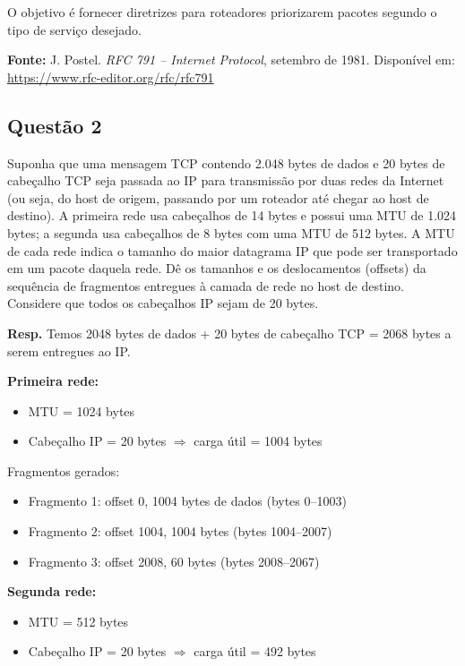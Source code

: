 O objetivo é fornecer diretrizes para roteadores priorizarem pacotes segundo o tipo de serviço desejado.

\textbf{Fonte:} J. Postel. \textit{RFC 791 – Internet Protocol}, setembro de 1981. Disponível em: \url{https://www.rfc-editor.org/rfc/rfc791}
\newline

\subsection{Questão 2}

Suponha que uma mensagem TCP contendo 2.048 bytes de dados e 20 bytes
de cabeçalho TCP seja passada ao IP para transmissão por duas redes da Internet
(ou seja, do host de origem, passando por um roteador até chegar ao host de
destino). A primeira rede usa cabeçalhos de 14 bytes e possui uma MTU de 1.024
bytes; a segunda usa cabeçalhos de 8 bytes com uma MTU de 512 bytes. A MTU de
cada rede indica o tamanho do maior datagrama IP que pode ser transportado em um
pacote daquela rede. Dê os tamanhos e os deslocamentos (offsets) da sequência de
fragmentos entregues à camada de rede no host de destino. Considere que todos os
cabeçalhos IP sejam de 20 bytes.
\newline

\textbf{Resp.} 
Temos 2048 bytes de dados + 20 bytes de cabeçalho TCP = 2068 bytes a serem entregues ao IP.
\newline

\textbf{Primeira rede:}
\begin{itemize}
    \item MTU = 1024 bytes
    \item Cabeçalho IP = 20 bytes $\Rightarrow$ carga útil = 1004 bytes
\end{itemize}


Fragmentos gerados:
\begin{itemize}
    \item Fragmento 1: offset 0, 1004 bytes de dados (bytes 0–1003)
    \item Fragmento 2: offset 1004, 1004 bytes (bytes 1004–2007)
    \item Fragmento 3: offset 2008, 60 bytes (bytes 2008–2067)
\end{itemize}

\textbf{Segunda rede:}
\begin{itemize}
    \item MTU = 512 bytes
    \item Cabeçalho IP = 20 bytes $\Rightarrow$ carga útil = 492 bytes
\end{itemize}

